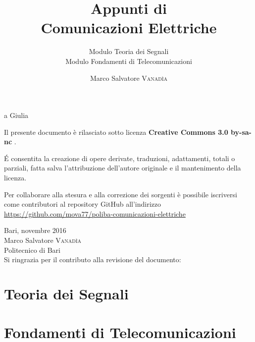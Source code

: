 \documentclass[10pt,a4paper,onecolumn,titlepage,twoside,openright,final]{book}
\title{Appunti di \\ Comunicazioni Elettriche}
\subtitle{Modulo Teoria dei Segnali\\Modulo Fondamenti di Telecomunicazioni}
\author{Marco Salvatore \textsc{Vanad\`{i}a}}
\begin{document}
\frontmatter
\maketitle
\newpage

\null{}
\begin{flushright}a Giulia\end{flushright}
\null
\vfill
Il presente documento è rilasciato sotto licenza \ccLogo \textbf{Creative Commons 3.0 by-sa-nc} \ccbyncsa.

\'{E} consentita la creazione di opere derivate, traduzioni, adattamenti, totali o parziali, fatta salva l'attribuzione dell'autore originale e il mantenimento della licenza.

Per collaborare alla stesura e alla correzione dei sorgenti è possibile iscriversi come contributori al repository GitHub all'indirizzo \url{https://github.com/mova77/poliba-comunicazioni-elettriche}

Bari, novembre 2016 \\ Marco Salvatore \textsc{Vanadìa}\\Politecnico di Bari\\

 Si ringrazia per il contributo alla revisione del documento:

\cleardoublepage\clearpage{\pagestyle{empty}\cleardoublepage}

\tableofcontents

\mainmatter
\part{Teoria dei Segnali}










\part{Fondamenti di Telecomunicazioni}








{}

{}
\printindex
{}
{}
\listoffigures
%
\end{document}
